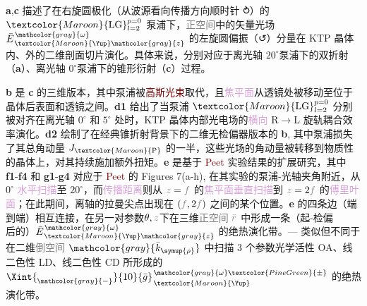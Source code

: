 \textbf{a},\textbf{c} 描述了在\textcolor{NavyBlue}{右旋圆极化}（从\textcolor{NavyBlue}{波源}看向传播方向顺时针 ⥁）的 $\textcolor{Maroon}{\text{LG}}^{p=0}_{l=2}$ \textcolor{NavyBlue}{泵浦}下，\textcolor{gray}{正空间}中的\textcolor{PineGreen}{矢量光场} $\bar{E}^{\;\!\mathcolor{gray}{\omega}}_{\;\! \textcolor{Maroon}{\Yup} \mathcolor{gray}{z}}$ 的\textcolor{NavyBlue}{左旋圆偏振}（↺）分量在 KTP 晶体内、外的二维剖面切片演化。具体来说，分别对应于离\textcolor{PineGreen}{光轴} $20^\circ$泵浦下的\textcolor{PineGreen}{双折射}（\textbf{a}）、离\textcolor{PineGreen}{光轴} $0^\circ$泵浦下的\textcolor{PineGreen}{锥形衍射}（\textbf{c}）过程。

\textbf{b} 是 \textbf{c} 的三维版本，其中\textcolor{NavyBlue}{泵浦}被\textcolor{Maroon}{高斯光束}取代，且\textcolor{Plum}{焦平面}从透镜处被移动至位于晶体后表面和透镜之间。\textbf{d1} 给出了当\textcolor{NavyBlue}{泵浦} $\textcolor{Maroon}{\text{LG}}^{p=0}_{l=2}$ 分别被对齐在离\textcolor{PineGreen}{光轴} $0^\circ$ 和 $5^\circ$ 处时，KTP 晶体内部\textcolor{PineGreen}{光电场}的\textcolor{Plum}{横向} R$\to$L \textcolor{NavyBlue}{旋轨耦合}效率演化。\textbf{d2} 绘制了在经典\textcolor{PineGreen}{锥折射}背景下的二维\textcolor{PineGreen}{无检偏器}版本的 \textbf{b}, 其中\textcolor{NavyBlue}{泵浦}损失了其\textcolor{NavyBlue}{总角动量} $J_{\textcolor{Maroon}{\text{P}}}$ 的一半，这些光场的\textcolor{NavyBlue}{角动量}被转移到物质性的晶体上，对其持续施加\textcolor{NavyBlue}{额外扭矩}\cite{berryOrbitalSpinAngular2005}。\textbf{e} 是基于 \textcolor{Maroon}{Peet} 实验结果的扩展研究，其中 \textbf{f1}-\textbf{f4} 和 \textbf{g1}-\textbf{g4} 对应于 \textcolor{Maroon}{Peet} 的 Figures 7(a-h)\cite{peetExperimentalStudyInternal2014}, 在其实验的\textcolor{NavyBlue}{泵浦}-\textcolor{PineGreen}{光轴}夹角附近，从 $0^\circ$ \textcolor{Plum}{水平扫描}至 $20^\circ$，而\textcolor{Plum}{传播距离}则从 $\mathcolor{gray}{z}=\mathcolor{gray}{f}$ 的\textcolor{Plum}{焦平面}\textcolor{Plum}{垂直扫描}到 $\mathcolor{gray}{z}=2\mathcolor{gray}{f}$ 的\textcolor{Plum}{傅里叶面}；在此期间，\textcolor{PineGreen}{离轴}的\textcolor{PineGreen}{拉曼尖点}出现在 $(\mathcolor{gray}{f},2\mathcolor{gray}{f})$ 之间的某个位置。\textbf{e} 的四条边（端到端）相互连接，在另一对参数$\theta,\mathcolor{gray}{z}$下在三维\textcolor{gray}{正空间} $\mathcolor{gray}{\bar{r}}$ 中形成一条（\textcolor{PineGreen}{起-检偏}后的）$\bar{E}^{\;\!\mathcolor{gray}{\omega}}_{\;\! \textcolor{Maroon}{\Yup} \mathcolor{gray}{z}}$ 的\textcolor{NavyBlue}{绝热演化}带。--- 类似但不同于  在二维\textcolor{gray}{倒空间} $\mathcolor{gray}{\bar{k}_{\symup{\rho}}}$ 中扫描 3 个参数\textcolor{NavyBlue}{光学活性 OA}、\textcolor{NavyBlue}{线二色性 LD}、\textcolor{NavyBlue}{线二色性 CD} 所形成的 $\Xint{{}^{}_{\mathcolor{gray}{-}}}{10}{\bar{g}}^{\;\!\mathcolor{gray}{\omega} \textcolor{PineGreen}{\pm}}_{\;\! \textcolor{Maroon}{\Yup}}$ 的\textcolor{NavyBlue}{绝热演化}带。

